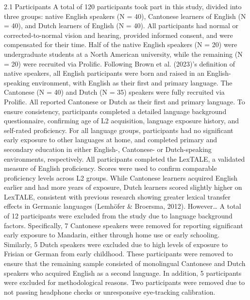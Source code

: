 2.1 Participants
A total of 120 participants took part in this study, divided into three groups: native English speakers (N = 40), Cantonese learners of English (N = 40), and Dutch learners of English (N = 40). All participants had normal or corrected-to-normal vision and hearing, provided informed consent, and were compensated for their time.
Half of the native English speakers (N = 20) were undergraduate students at a North American university, while the remaining (N = 20) were recruited via Prolific. Following Brown et al. (2023)’s definition of native speakers, all English participants were born and raised in an English-speaking environment, with English as their first and primary language.
The Cantonese (N = 40) and Dutch (N = 35) speakers were fully recruited via Prolific. All reported Cantonese or Dutch as their first and primary language.
To ensure consistency, participants completed a detailed language background questionnaire, confirming age of L2 acquisition, language exposure history, and self-rated proficiency. For all language groups, participants had no significant early exposure to other languages at home, and completed primary and secondary education in either English-, Cantonese- or Dutch-speaking environments, respectively.
All participants completed the LexTALE, a validated measure of English proficiency. Scores were used to confirm comparable proficiency levels across L2 groups. While Cantonese learners acquired English earlier and had more years of exposure, Dutch learners scored slightly higher on LexTALE, consistent with previous research showing greater lexical transfer effects in Germanic languages (Lemhöfer & Broersma, 2012). However…
A total of 12 participants were excluded from the study due to language background factors. Specifically, 7 Cantonese speakers were removed for reporting significant early exposure to Mandarin, either through home use or early schooling. Similarly, 5 Dutch speakers were excluded due to high levels of exposure to Frisian or German from early childhood. These participants were removed to ensure that the remaining sample consisted of monolingual Cantonese and Dutch speakers who acquired English as a second language.
In addition, 5 participants were excluded for methodological reasons. Two participants were removed due to not passing headphone checks or unresponsive eye-tracking calibration. 
